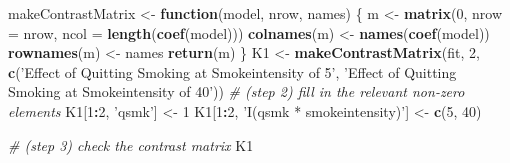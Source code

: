 \documentclass[
  10pt,
]{book}
\newenvironment{Shaded}{\begin{snugshade}}{\end{snugshade}}
\newcommand{\CommentTok}[1]{\textcolor[rgb]{0.56,0.35,0.01}{\textit{#1}}}
\newcommand{\ControlFlowTok}[1]{\textcolor[rgb]{0.13,0.29,0.53}{\textbf{#1}}}
\newcommand{\DataTypeTok}[1]{\textcolor[rgb]{0.13,0.29,0.53}{#1}}
\newcommand{\DecValTok}[1]{\textcolor[rgb]{0.00,0.00,0.81}{#1}}
\newcommand{\KeywordTok}[1]{\textcolor[rgb]{0.13,0.29,0.53}{\textbf{#1}}}
\newcommand{\NormalTok}[1]{#1}
\newcommand{\OperatorTok}[1]{\textcolor[rgb]{0.81,0.36,0.00}{\textbf{#1}}}
\newcommand{\StringTok}[1]{\textcolor[rgb]{0.31,0.60,0.02}{#1}}
\begin{document}
\begin{Shaded}
\begin{Highlighting}[]
\NormalTok{makeContrastMatrix <-}\StringTok{ }\ControlFlowTok{function}\NormalTok{(model, nrow, names) \{}
\NormalTok{  m <-}\StringTok{ }\KeywordTok{matrix}\NormalTok{(}\DecValTok{0}\NormalTok{, }\DataTypeTok{nrow =}\NormalTok{ nrow, }\DataTypeTok{ncol =} \KeywordTok{length}\NormalTok{(}\KeywordTok{coef}\NormalTok{(model)))}
  \KeywordTok{colnames}\NormalTok{(m) <-}\StringTok{ }\KeywordTok{names}\NormalTok{(}\KeywordTok{coef}\NormalTok{(model))}
  \KeywordTok{rownames}\NormalTok{(m) <-}\StringTok{ }\NormalTok{names}
  \KeywordTok{return}\NormalTok{(m)}
\NormalTok{\}}
\NormalTok{K1 <-}\StringTok{ }\KeywordTok{makeContrastMatrix}\NormalTok{(fit, }\DecValTok{2}\NormalTok{, }\KeywordTok{c}\NormalTok{(}\StringTok{'Effect of Quitting Smoking at Smokeintensity of 5'}\NormalTok{,}
                                      \StringTok{'Effect of Quitting Smoking at Smokeintensity of 40'}\NormalTok{))}
\CommentTok{# (step 2) fill in the relevant non-zero elements }
\NormalTok{K1[}\DecValTok{1}\OperatorTok{:}\DecValTok{2}\NormalTok{, }\StringTok{'qsmk'}\NormalTok{] <-}\StringTok{ }\DecValTok{1}
\NormalTok{K1[}\DecValTok{1}\OperatorTok{:}\DecValTok{2}\NormalTok{, }\StringTok{'I(qsmk * smokeintensity)'}\NormalTok{] <-}\StringTok{ }\KeywordTok{c}\NormalTok{(}\DecValTok{5}\NormalTok{, }\DecValTok{40}\NormalTok{)}

\CommentTok{# (step 3) check the contrast matrix}
\NormalTok{K1 }
\end{Highlighting}
\end{Shaded}
\end{document}
